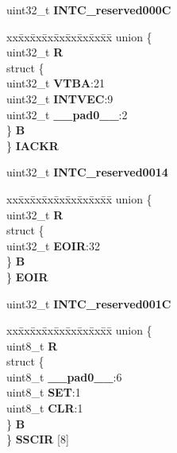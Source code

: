 \begin{DoxyCompactItemize}
\begin{tabbing}
\end{tabbing}\item 
\mbox{\label{structINTC__tag_ab9fb34a3499bfe42a0d346520025400e}} 
uint32\+\_\+t {\bfseries I\+N\+T\+C\+\_\+reserved000C}
\item 
\mbox{\label{structINTC__tag_ab24e0e6194ff42eddf99b4a7f4c3aedb}} 
\begin{tabbing}
xx\=xx\=xx\=xx\=xx\=xx\=xx\=xx\=xx\=\kill
union \{\\
\>uint32\_t {\bfseries R}\\
\>struct \{\\
\>\>uint32\_t {\bfseries VTBA}:21\\
\>\>uint32\_t {\bfseries INTVEC}:9\\
\>\>uint32\_t {\bfseries \_\_pad0\_\_}:2\\
\>\} {\bfseries B}\\
\} {\bfseries IACKR}\\

\end{tabbing}\item 
\mbox{\label{structINTC__tag_adf29bb735db2bb670a0b03f3909e1f57}} 
uint32\+\_\+t {\bfseries I\+N\+T\+C\+\_\+reserved0014}
\item 
\mbox{\label{structINTC__tag_a8263c5c3c791eb34aaf78aa831d579c3}} 
\begin{tabbing}
xx\=xx\=xx\=xx\=xx\=xx\=xx\=xx\=xx\=\kill
union \{\\
\>uint32\_t {\bfseries R}\\
\>struct \{\\
\>\>uint32\_t {\bfseries EOIR}:32\\
\>\} {\bfseries B}\\
\} {\bfseries EOIR}\\

\end{tabbing}\item 
\mbox{\label{structINTC__tag_a39f491cf851000c2e4c8bf60df172de8}} 
uint32\+\_\+t {\bfseries I\+N\+T\+C\+\_\+reserved001C}
\item 
\mbox{\label{structINTC__tag_ae9acf6743eda73227398872fae699a06}} 
\begin{tabbing}
xx\=xx\=xx\=xx\=xx\=xx\=xx\=xx\=xx\=\kill
union \{\\
\>uint8\_t {\bfseries R}\\
\>struct \{\\
\>\>uint8\_t {\bfseries \_\_pad0\_\_}:6\\
\>\>uint8\_t {\bfseries SET}:1\\
\>\>uint8\_t {\bfseries CLR}:1\\
\>\} {\bfseries B}\\
\} {\bfseries SSCIR} \mbox{[}8\mbox{]}\\


\end{tabbing}
\end{DoxyCompactItemize}
